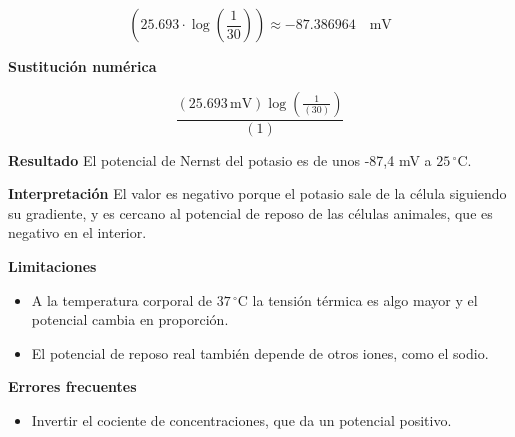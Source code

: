 \documentclass{book}
\begin{document}
\begin{tcolorbox}[title={Problema resuelto}, studiumworked, breakable]
\begin{enumerate}
\[
\left(25.693\cdot \operatorname{log}\left(\frac{1}{30}\right)\right) \approx -87.386964\quad \mathrm{mV}
\]
\end{enumerate}

\noindent\textbf{Sustitución numérica}

\[
\frac{\left(25.693\,\mathrm{mV}\right) \log{\left(\frac{1}{\left(30\right)} \right)}}{\left(1\right)}
\]

\noindent\textbf{Resultado}
El potencial de Nernst del potasio es de unos -87,4 mV a \(25\,{}^{\circ}\mathrm{C}\).


\noindent\textbf{Interpretación}
El valor es negativo porque el potasio sale de la célula siguiendo su gradiente, y es cercano al potencial de reposo de las células animales, que es negativo en el interior.


\noindent\textbf{Limitaciones}
\begin{itemize}
\item A la temperatura corporal de \(37\,{}^{\circ}\mathrm{C}\) la tensión térmica es algo mayor y el potencial cambia en proporción.
\item El potencial de reposo real también depende de otros iones, como el sodio.
\end{itemize}

\noindent\textbf{Errores frecuentes}
\begin{itemize}
\item Invertir el cociente de concentraciones, que da un potencial positivo.
\end{itemize}
\end{tcolorbox}
\end{document}
